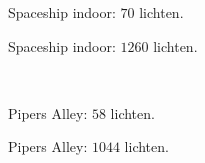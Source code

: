 \begin{figure}[p]
  \begin{adjustbox}{minipage=\textwidth, scale=0.5}
    \begin{subfigure}[b]{0.83\textwidth}
      \centering
      \def\svgwidth{\textwidth}
      
      \caption{Spaceship indoor: $70$ lichten.}
      \label{fig:hs-nodesize-construction-time::si-low}
    \end{subfigure}
  \end{adjustbox} %
  \begin{adjustbox}{minipage=\textwidth, scale=0.5}
    \begin{subfigure}[b]{0.83\textwidth}
      \centering
      \def\svgwidth{\textwidth}
      
      \caption{Spaceship indoor: $1260$ lichten.}
      \label{fig:hs-nodesize-construction-time::si-high}
    \end{subfigure}
  \end{adjustbox} \\
  \begin{adjustbox}{minipage=\textwidth, scale=0.5}
    \begin{subfigure}[b]{0.83\textwidth}
      \centering
      \def\svgwidth{\textwidth}
      
      \caption{Pipers Alley: $58$ lichten.}
      \label{fig:hs-nodesize-construction-time::pa-low}
    \end{subfigure}
  \end{adjustbox} %
  \begin{adjustbox}{minipage=\textwidth, scale=0.5}
    \begin{subfigure}[b]{0.83\textwidth}
      \centering
      \def\svgwidth{\textwidth}
      
      \caption{Pipers Alley: $1044$ lichten.}
      \label{fig:hs-nodesize-construction-time::pa-high}
    \end{subfigure}
  \end{adjustbox} \\
  \begin{adjustbox}{minipage=\textwidth, scale=0.5}
    \begin{subfigure}[b]{0.83\textwidth}
      \centering
      \def\svgwidth{\textwidth}
      

\end{subfigure}
\end{adjustbox}
\end{figure}
